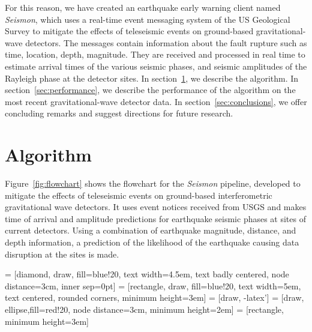 \documentclass[twocolumn, aps, superscriptaddress]{revtex4}
\begin{document}
For this reason, we have created an earthquake early warning client named \emph{Seismon}, which uses a real-time event messaging system of the US Geological Survey to mitigate the effects of teleseismic events on ground-based gravitational-wave detectors. The messages contain information about the fault rupture such as time, location, depth, magnitude. They are received and processed in real time to estimate arrival times of the various seismic phases, and seismic amplitudes of the Rayleigh phase at the detector sites.
In section~\ref{sec:algorithm}, we describe the algorithm.
In section~\ref{sec:performance}, we describe the performance of the algorithm on the most recent gravitational-wave detector data.
In section~\ref{sec:conclusions}, we offer concluding remarks and suggest directions for future research.

\section{Algorithm}
\label{sec:algorithm}

Figure~\ref{fig:flowchart} shows the flowchart for the \emph{Seismon} pipeline, developed to mitigate the effects of teleseismic events on ground-based interferometric gravitational wave detectors. It uses event notices received from USGS and makes time of arrival and amplitude predictions for earthquake seismic phases at sites of current detectors. Using a combination of earthquake magnitude, distance, and depth information, a prediction of the likelihood of the earthquake causing data disruption at the sites is made.

 = [diamond, draw, fill=blue!20,
    text width=4.5em, text badly centered, node distance=3cm, inner sep=0pt]
 = [rectangle, draw, fill=blue!20,
    text width=5em, text centered, rounded corners, minimum height=3em]
 = [draw, -latex']
 = [draw, ellipse,fill=red!20, node distance=3cm,
    minimum height=2em]
 = [rectangle, minimum height=3em]
\end{document}
